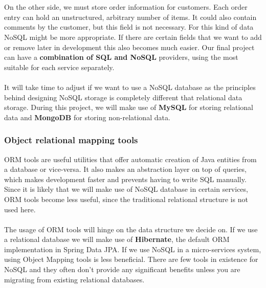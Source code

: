 \documentclass[12pt]{article}
\begin{document}
\begin{multicols}{2}
\\\\
On the other side, we must store order information for customers. Each order entry can hold an unstructured, arbitrary number of items. It could also contain comments by the customer, but this field is not necessary. For this kind of data NoSQL might be more appropriate. If there are certain fields that we want to add or remove later in development this also becomes much easier. Our final project can have a \textbf{combination of SQL and NoSQL} providers, using the most suitable for each service separately. 
\\\\
It will take time to adjust if we want to use a NoSQL database as the principles behind designing NoSQL storage is completely different that relational data storage. During this project, we will make use of \textbf{MySQL} for storing relational data and \textbf{MongoDB} for storing non-relational data.

\subsubsection{Object relational mapping tools}
ORM tools are useful utilities that offer automatic creation of Java entities from a database or vice-versa. It also makes an abstraction layer on top of queries, which makes development faster and prevents having to write SQL manually. Since it is likely that we will make use of NoSQL database in certain services, ORM tools become less useful, since the traditional relational structure is not used here. 
\\\\
The usage of ORM tools will hinge on the data structure we decide on. If we use a relational database we will make use of \textbf{Hibernate}, the default ORM implementation in Spring Data JPA. If we use NoSQL in a micro-services system, using Object Mapping tools is less beneficial. There are few tools in existence for NoSQL and they often don't provide any significant benefits unless you are migrating from existing relational databases. \cite{ormNosql85:online}


\end{multicols}
\end{document}
